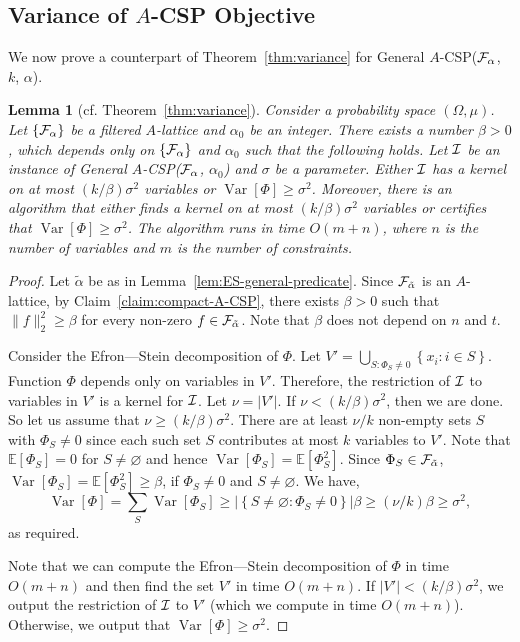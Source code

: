\documentclass[11pt]{article}
\DeclareMathOperator {\Var}  {Var}
\newcommand {\set}   [1] {\left\{ #1 \right\}}
\newcommand {\Exp}       {\mathbb{E}}
\newcommand {\E}     [1] {\Exp\left[#1\right]}
\newcommand {\Varr}  [1] {\Var \left[#1\right]}
\newcommand {\calF}   {{\cal{F}}}
\newtheorem{lemma}[theorem]{Lemma}
\begin{document}
\subsection{Variance of $A$-CSP Objective}
We now prove a counterpart of Theorem~\ref{thm:variance} for General $A$-CSP($\calF_{\alpha}$, $k$, $\alpha$).
\begin{lemma}[cf. Theorem~\ref{thm:variance}]\label{lem:variance-A-CSP}
Consider a probability space $(\Omega,\mu)$. Let  $\set{\calF_{\alpha}}$ be a filtered $A$-lattice and $\alpha_0$ be an integer.
There exists a number $\beta > 0$, which depends only on $\set{\calF_{\alpha}}$ and $\alpha_0$ such that the following holds.
Let $\cal I$ be an instance of General $A$-CSP($\calF_{\alpha}$, $\alpha_0$) and  $\sigma$ be a parameter.
Either $\cal I$ has a kernel on at most $(k / \beta) \sigma^2$ variables or $\Varr{\Phi} \geq \sigma^2$. Moreover,
there is an algorithm that either finds a kernel on at most $(k / \beta) \sigma^2$ variables or certifies that
$\Varr{\Phi} \geq \sigma^2$. The algorithm runs in time $O(m+n)$, where $n$ is the number of variables and $m$ is the number of constraints.
\end{lemma}
\begin{proof}
Let $\tilde\alpha$ be as in Lemma~\ref{lem:ES-general-predicate}. Since $\calF_{\tilde\alpha}$ is an $A$-lattice, by Claim~\ref{claim:compact-A-CSP},
there exists $\beta > 0$ such that $\|f\|^2_2 \geq \beta$ for every non-zero $f\in \calF_{\tilde\alpha}$.
Note that $\beta$ does not depend on $n$ and $t$.

Consider the Efron---Stein decomposition of $\Phi$. Let $V' = \bigcup_{S: \Phi_S \neq 0} \set{x_i:i\in S}$.
Function $\Phi$ depends only on variables in $V'$. Therefore, the restriction of $\cal I$ to variables in $V'$ is a kernel for $\cal I$. Let $\nu = |V'|$.
If $\nu < (k / \beta) \sigma^2$, then we are done. So let us assume that $\nu \geq (k / \beta) \sigma^2$.
There are at least $\nu / k$ non-empty sets $S$ with $\Phi_S \neq 0$ since each such set $S$ contributes at most $k$ variables to $V'$.
Note that $\E{\Phi_S} = 0$ for $S\neq \varnothing$ and hence $\Varr{\Phi_S} = \E{\Phi_S^2}$. Since $\Phi_S \in  \calF_{\tilde\alpha}$,
$\Varr{\Phi_S} = \E{\Phi_S^2} \geq \beta$, if $\Phi_S \neq 0$ and $S\neq \varnothing$. We have,
$$\Varr{\Phi} = \sum_S \Varr{\Phi_S}
\geq |\set{S\neq \varnothing:\Phi_S \neq 0}| \beta
\geq (\nu / k) \beta \geq \sigma^2,
$$
as required.

Note that we can compute the Efron---Stein decomposition of $\Phi$ in time $O(m+n)$ and then find the set $V'$ in time $O(m+n)$. If $|V'| < (k/\beta)\sigma^2$, we output the restriction of $\cal I$ to $V'$ (which we compute in time $O(m+n)$). Otherwise, we output that $\Varr{\Phi} \geq \sigma^2$.
\end{proof}
\end{document}
